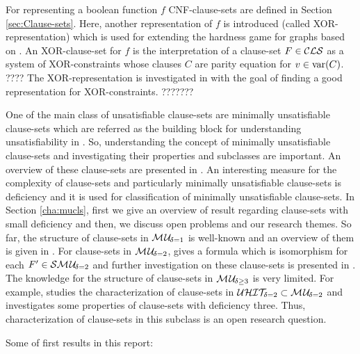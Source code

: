 \documentclass{report}
\begin{document}
For representing a boolean function $f$ CNF-clause-sets are defined in Section \ref{sec:Clause-sets}. Here, another representation of $f$ is introduced (called XOR-representation) which is used for extending the hardness game for graphs based on \cite{GwynneKullmann2013GoodRepresentationsIIex,GwynneKullmann2013GoodRepresentationsIILata}. An XOR-clause-set for $f$ is the interpretation of a clause-set $F \in \mathcal{CLS}$ as a system of XOR-constraints whose clauses $C$ are parity equation for $v \in \operatorname{var}(C)$. 
????
The XOR-representation is investigated in \cite{GwynneKullmann2013GoodRepresentations,GwynneKullmann2013GoodRepresentationsIIex,GwynneKullmann2013GoodRepresentationsIILata} with the goal of finding a good representation for XOR-constraints.
???????

One of the main class of unsatisfiable clause-sets are minimally unsatisfiable clause-sets which are referred as the building block for understanding unsatisfiability in \cite{KullmannZhao2010Extremal}. So, understanding the concept of minimally unsatisfiable clause-sets and investigating their properties and subclasses are important. An overview of these clause-sets are presented in \cite{KullmannZhao2010Extremal, Kullmann2007HandbuchMU,KullmannZhao2012ConfluenceJ}. An interesting measure for the complexity of clause-sets and particularly minimally unsatisfiable clause-sets is deficiency and it is used for classification of minimally unsatisfiable clause-sets. In Section \ref{cha:mucls}, first we give an overview of result regarding clause-sets with small deficiency and then, we discuss open problems and our research themes. So far, the structure of clause-sets in $\mathcal{M\hspace{0.8pt}U}_{\!\delta=1}$ is well-known and an overview of them is given in \cite{KullmannZhao2010Extremal, Ku99dK,KleineBuening2000SubclassesMU,DDK98}. For clause-sets in $\mathcal{M\hspace{0.8pt}U}_{\!\delta=2}$, \cite{KleineBuening2000SubclassesMU} gives a formula which is isomorphism for each $F' \in \mathcal{S}\mathcal{M\hspace{0.8pt}U}_{\!\delta=2}$ and further investigation on these clause-sets is presented in \cite{KullmannZhao2010Extremal, KleineBuening2000SubclassesMU, KullmannZhao2012ConfluenceJ}. The knowledge for the structure of clause-sets in $\mathcal{M\hspace{0.8pt}U}_{\!\delta \ge 3}$ is very limited. For example, \cite{KullmannZhao2016UHitSAT} studies the characterization of clause-sets in $\mathcal{U}\mathcal{HIT}_{\!\!\delta=2} \subset \mathcal{M\hspace{0.8pt}U}_{\!\delta=2}$ and \cite{KullmannZhao2010Extremal} investigates some properties of clause-sets with deficiency three. Thus, characterization of clause-sets in this subclass is an open research question.

Some of first results in this report:
\end{document}
